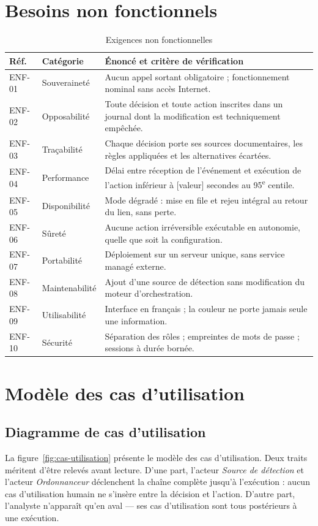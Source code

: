 \section{Besoins non fonctionnels}
\begin{table}[H]
\centering
\caption{Exigences non fonctionnelles}
\label{tab:exigences-non-fonctionnelles}
\scriptsize
\begin{tabular}{@{}llp{8.4cm}@{}}
\toprule
\textbf{R\'ef.} & \textbf{Cat\'egorie} & \textbf{\'Enonc\'e et crit\`ere de v\'erification} \\
\midrule
ENF-01 & Souverainet\'e & Aucun appel sortant obligatoire ; fonctionnement nominal sans acc\`es Internet. \\
ENF-02 & Opposabilit\'e & Toute d\'ecision et toute action inscrites dans un journal dont la modification est techniquement emp\^ech\'ee. \\
ENF-03 & Tra\c cabilit\'e & Chaque d\'ecision porte ses sources documentaires, les r\`egles appliqu\'ees et les alternatives \'ecart\'ees. \\
ENF-04 & Performance & D\'elai entre r\'eception de l'\'ev\'enement et ex\'ecution de l'action inf\'erieur \`a [valeur] secondes au 95\textsuperscript{e} centile. \\
ENF-05 & Disponibilit\'e & Mode d\'egrad\'e : mise en file et rejeu int\'egral au retour du lien, sans perte. \\
ENF-06 & S\^uret\'e & Aucune action irr\'eversible ex\'ecutable en autonomie, quelle que soit la configuration. \\
ENF-07 & Portabilit\'e & D\'eploiement sur un serveur unique, sans service manag\'e externe. \\
ENF-08 & Maintenabilit\'e & Ajout d'une source de d\'etection sans modification du moteur d'orchestration. \\
ENF-09 & Utilisabilit\'e & Interface en fran\c cais ; la couleur ne porte jamais seule une information. \\
ENF-10 & S\'ecurit\'e & S\'eparation des r\^oles ; empreintes de mots de passe ; sessions \`a dur\'ee born\'ee. \\
\bottomrule
\end{tabular}
\end{table}

\section{Mod\`ele des cas d'utilisation}
\subsection{Diagramme de cas d'utilisation}
La figure~\ref{fig:cas-utilisation} pr\'esente le mod\`ele des cas d'utilisation.
Deux traits m\'eritent d'\^etre relev\'es avant lecture. D'une part, l'acteur
\emph{Source de d\'etection} et l'acteur \emph{Ordonnanceur} d\'eclenchent la cha\^ine
compl\`ete jusqu'\`a l'ex\'ecution : aucun cas d'utilisation humain ne s'ins\`ere entre la
d\'ecision et l'action. D'autre part, l'analyste n'appara\^it qu'en aval --- ses cas
d'utilisation sont tous post\'erieurs \`a une ex\'ecution.

